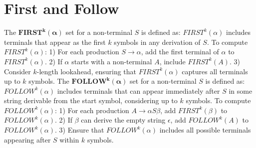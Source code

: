 
\section{First and Follow}
The $\mathbf{FIRST^k(\alpha)}$ set for a non-terminal $S$ is defined as:
    $FIRST^k(\alpha)$ includes terminals that appear as the first $k$ symbols in any derivation of $S$.
    To compute $FIRST^k(\alpha)$:
        1) For each production $S \to \alpha$, add the first terminal of $\alpha$ to $FIRST^k(\alpha)$.
        2) If $\alpha$ starts with a non-terminal $A$, include $FIRST^k(A)$.
        3) Consider $k$-length lookahead, ensuring that $FIRST^k(\alpha)$ captures all terminals up to $k$ symbols.
The $\mathbf{FOLLOW^k(\alpha)}$ set for a non-terminal $S$ is defined as:
    $FOLLOW^k(\alpha)$ includes terminals that can appear immediately after $S$ in some string derivable from the start symbol, considering up to $k$ symbols.
    To compute $FOLLOW^k(\alpha)$:
        1) For each production $A \to \alpha S \beta$, add $FIRST^k(\beta)$ to $FOLLOW^k(\alpha)$.
        2) If $\beta$ can derive the empty string $\epsilon$, add $FOLLOW^k(A)$ to $FOLLOW^k(\alpha)$.
        3) Ensure that $FOLLOW^k(\alpha)$ includes all possible terminals appearing after $S$ within $k$ symbols.
